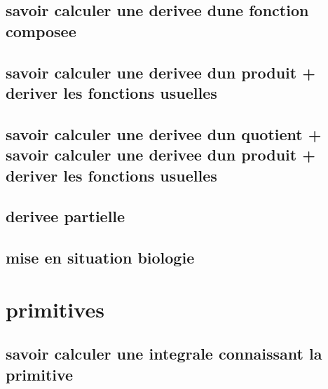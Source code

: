 \documentclass[11pt]{article}
\begin{document}
    \subsection{savoir calculer une derivee dune fonction composee}
      
      
    \subsection{savoir calculer une derivee dun produit + deriver les fonctions usuelles}
      
      
    \subsection{savoir calculer une derivee dun quotient + savoir calculer une derivee dun produit + deriver les fonctions usuelles}
      
      
    \subsection{derivee partielle}
      
    \subsection{mise en situation   biologie}
      
  \section{primitives}
    \subsection{savoir calculer une integrale connaissant la primitive}
      
      
\end{document}
